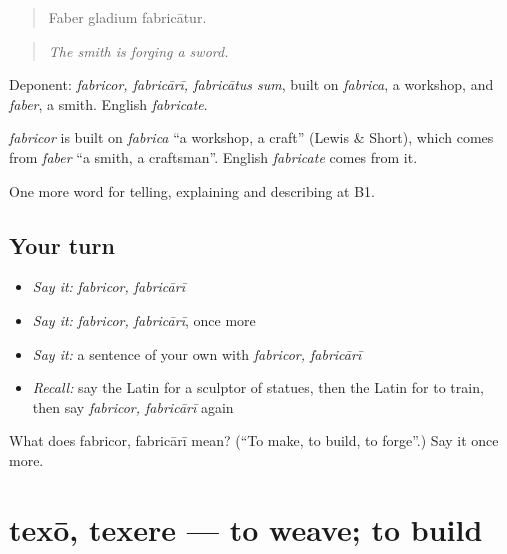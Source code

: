 \begin{quote}
Faber gladium fabricātur.
\end{quote}

\begin{quote}
\emph{The smith is forging a sword.}
\end{quote}

Deponent: \emph{fabricor, fabricārī, fabricātus sum}, built on \emph{fabrica}, a workshop, and \emph{faber}, a smith. English \emph{fabricate}.

\begin{cousinweb}
\emph{fabricor} is built on \emph{fabrica} \textquotedblleft{}a workshop, a craft\textquotedblright{} (Lewis \& Short), which comes from \emph{faber} \textquotedblleft{}a smith, a craftsman\textquotedblright{}. English \emph{fabricate} comes from it.
\end{cousinweb}

\begin{grammarlens}[title={What you've built}]
One more word for telling, explaining and describing at B1.
\end{grammarlens}

\subsection*{Your turn}
\begin{itemize}
\raggedright
  \item \emph{Say it:} \emph{fabricor, fabricārī}
  \item \emph{Say it:} \emph{fabricor, fabricārī}, once more
  \item \emph{Say it:} a sentence of your own with \emph{fabricor, fabricārī}
  \item \emph{Recall:} say the Latin for a sculptor of statues, then the Latin for to train, then say \emph{fabricor, fabricārī} again
\end{itemize}

\begin{tcolorbox}[breakable,colback=teal!4,colframe=teal!35!black,title={Before you move on}]
What does fabricor, fabricārī mean? (\textquotedblleft{}To make, to build, to forge\textquotedblright{}.) Say it once more.
\end{tcolorbox}
\section[texō, texere]{texō, texere — to weave; to build}

\label{lesson:LA-C378-texo}



